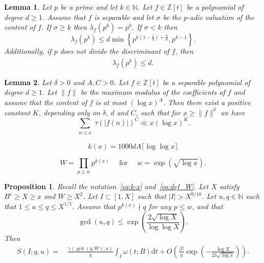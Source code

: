 \documentclass[10pt,a4paper]{amsart}
\newtheorem{lemma}{Lemma}
\newtheorem{proposition}{Proposition}
\newcommand\NN{\mathbb{N}}
\newcommand\ZZ{\mathbb{Z}}
\renewcommand{\d}{\mathrm{d}}
\renewcommand{\geq}{\geqslant}
\renewcommand{\leq}{\leqslant}
\begin{document}
\begin{lemma}\label{lem:stewart}
Let $p$ be a prime and let $k\in \NN$. Let $f\in \mathbb{Z}[t]$ be a polynomial of degree $d\geq 1$. Assume that $f$ is separable  and let $\sigma$ be the $p$-adic valuation of the  content of $f$. 
If $\sigma\geq k$ then $\lambda_f(p^k)=p^k$. If $\sigma<k$ then
$$
\lambda_f(p^k)\leq d \min\left\{p^{k(1-\frac{1}{d})+\frac{\sigma}{d}},  p^{k-1}\right\}.
$$
Additionally, if $p$ does not divide the discriminant of $f$, then
\begin{align*}
\lambda_f(p^k)\leq d.     
\end{align*}
\end{lemma}

\begin{lemma}\label{lem:henriot}
Let $\delta>0$ and $A,C>0$. Let $f\in \ZZ[t]$ be a 
separable 
polynomial of degree $d\geq 1$. Let $\|f\|$ be the maximum modulus of the coefficients of $f$ and assume that the content of $f$ is at most $(\log x)^A$. Then there exist a positive constant $K$, depending only on $\delta$, $d$ and $C$, such that for $x\geq \|f\|^{\delta}$ we have
$$
\sum_{\substack{n\leq x}} \tau(|f(n)|)^C \ll x (\log x)^{K}.
$$
\end{lemma}

\begin{equation}\label{eq:k-x}
k(x)=1000dA \lceil \log\log x\rceil
\end{equation}

\begin{equation}\label{eq:def_W}
W=\prod_{p\leq w} p^{k(x)}\quad \text{ for }\quad 
w=\exp(\sqrt{\log x}).
\end{equation}

\begin{proposition}\label{prop:1moment} Recall the notation~\eqref{eq:k-x} and~\eqref{eq:def_W}.
Let $X$ satisfy  $B^e\geq X\geq x$ and $W\geq X^2$. Let $I\subset [1,X]$ such that $|I|>X^{9/10}$. 
Let $u,q\in \NN$ such that $1\leq u\leq q\leq X^{1/5}$. Assume that $p^{k(x)}\nmid q$ for any $p\leq w$, and that
 \begin{equation}\label{eq:assume-gcd}
\gcd(u,q)\leq \exp \left(\frac{2\sqrt{\log X}}{\log\log X}\right).
\end{equation}
Then 
\begin{align*}
S(I;q,u)=~& \frac{\gamma(\gcd(q,W),u)}{q}\int_{I} \omega(t;B)\d t  +
 O\left(\frac{|I|}{q}
 \exp\left(-\frac{\log X}{23\sqrt{\log x}} \right)
\right).
\end{align*}
\end{proposition}
\end{document}
